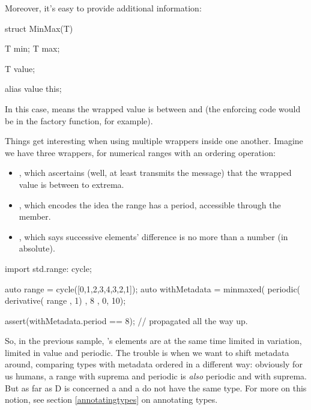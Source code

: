 Moreover, it's easy to provide additional information:

\begin{dcode}
struct MinMax(T)
{
    T min;
    T max;
    
    T value;
    
    alias value this;
}
\end{dcode}

In this case,  means the wrapped value is between  and  (the enforcing code would be in the factory function, for example).
        
Things get interesting when using multiple wrappers inside one another. Imagine we have three wrappers, for numerical ranges with an ordering operation:

\begin{itemize}
\item {}, which ascertains (well, at least transmits the message) that the wrapped value is between to extrema.
\item {}, which encodes the idea the range has a period, accessible through the  member.
\item {}, which says successive elements' difference is no more than a  number (in absolute).
\end{itemize}

\begin{dcode}
import std.range: cycle;

auto range = cycle([0,1,2,3,4,3,2,1]);
auto withMetadata = minmaxed( 
                              periodic( 
                                       derivative( range
                                                 , 1)
                                      , 8
                            , 0, 10);

assert(withMetadata.period == 8); // propagated all the way up.
\end{dcode}

So, in the previous sample, 's elements are at the same time limited in variation, limited in value and periodic. The trouble is when we want to shift metadata around, comparing types with metadata ordered in a different way: obviously for us humans, a range with suprema and periodic is \emph{also} periodic and with suprema. But as far as D is concerned a  and a  do not have the same type. For more on this notion, see section \ref{annotatingtypes} on annotating types.


